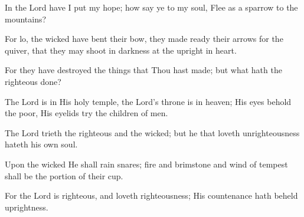In the Lord have I put my hope; how say ye to my soul, Flee as a sparrow to the mountains?

For lo, the wicked have bent their bow, they made ready their arrows for the quiver, that they may shoot in darkness at the upright in heart.

For they have destroyed the things that Thou hast made; but what hath the righteous done?

The Lord is in His holy temple, the Lord’s throne is in heaven; His eyes behold the poor, His eyelids try the children of men.

The Lord trieth the righteous and the wicked; but he that loveth unrighteousness hateth his own soul.

Upon the wicked He shall rain snares; fire and brimstone and wind of tempest shall be the portion of their cup.

For the Lord is righteous, and loveth righteousness; His countenance hath beheld uprightness.
